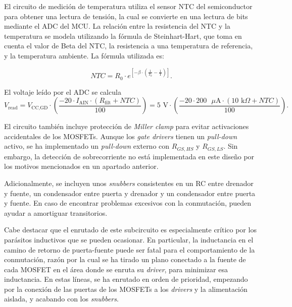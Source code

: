 El circuito de medición de temperatura utiliza el sensor NTC del semiconductor para obtener una lectura de tensión, la cual se convierte en una lectura de bits mediante el ADC del MCU. La relación entre la resistencia del NTC y la temperatura se modela utilizando la fórmula de Steinhart-Hart, que toma en cuenta el valor de Beta del NTC, la resistencia a una temperatura de referencia, y la temperatura ambiente. La fórmula utilizada es:

\[
NTC = R_0 \cdot e^{\left[-\beta \cdot \left(\frac{1}{T_0} - \frac{1}{\text{T}}\right)\right]} \text{.}
\]

El voltaje leído por el ADC se calcula
\[
V_{\text{read}} = V_{\text{CC,GD}} \cdot \left(\frac{-20 \cdot I_{\text{AIN}} \cdot (R_{\text{filt}} + NTC)}{100}\right) = 5 \text{ V} \cdot \left(\frac{-20 \cdot 200 \text{ }\mu\text{A} \cdot (10 \text{ k}\Omega + NTC)}{100}\right) \text{.}
\]

El circuito también incluye protección de \textit{Miller clamp} para evitar activaciones accidentales de los MOSFETs. Aunque los \textit{gate drivers} tienen un \textit{pull-down} activo, se ha implementado un \textit{pull-down} externo con $R_{GS,HS}$ y $R_{GS,LS}$. Sin embargo, la detección de sobrecorriente no está implementada en este diseño por los motivos mencionados en un apartado anterior.

Adicionalmente, se incluyen unos \textit{snubbers} consistentes en un RC entre drenador y fuente, un condensador entre puerta y drenador y un condensador entre puerta y fuente. En caso de encontrar problemas excesivos con la conmutación, pueden ayudar a amortiguar transitorios.

Cabe destacar que el enrutado de este subcircuito es especialmente crítico por los parásitos inductivos que se pueden ocasionar. En particular, la inductancia en el camino de retorno de puerta-fuente puede ser fatal para el comportamiento de la conmutación, razón por la cual se ha tirado un plano conectado a la fuente de cada MOSFET en el área donde se enruta su \textit{driver}, para minimizar esa inductancia. En estas líneas, se ha enrutado en orden de prioridad, empezando por la conexión de las puertas de los MOSFETs a los \textit{drivers} y la alimentación aislada, y acabando con los \textit{snubbers}.

